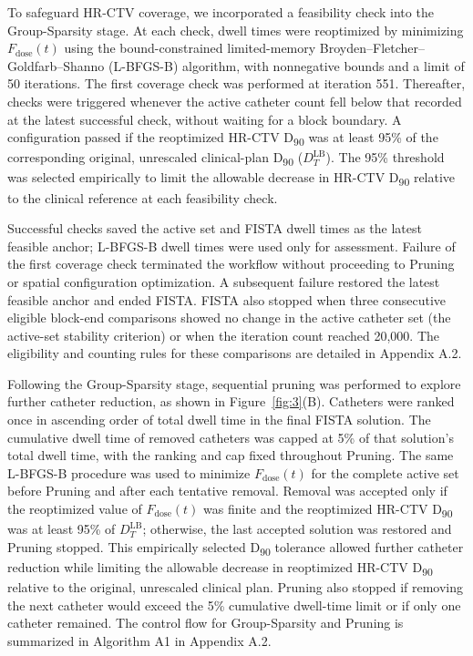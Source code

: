 \documentclass[12pt,twoside,letterpaper]{article}
\newcounter{algorithm}
\begin{document}
To safeguard HR-CTV coverage, we incorporated a feasibility check into the Group-Sparsity stage. At each check, dwell times were reoptimized by minimizing $F_{\text{dose}}\left( t \right)$ using the bound-constrained limited-memory Broyden--Fletcher--Goldfarb--Shanno (L-BFGS-B) algorithm,\cite{ref76,ref77} with nonnegative bounds and a limit of 50 iterations. The first coverage check was performed at iteration 551. Thereafter, checks were triggered whenever the active catheter count fell below that recorded at the latest successful check, without waiting for a block boundary. A configuration passed if the reoptimized HR-CTV D\textsubscript{90} was at least 95\% of the corresponding original, unrescaled clinical-plan D\textsubscript{90} ($D_{T}^{\text{LB}}$). The 95\% threshold was selected empirically to limit the allowable decrease in HR-CTV D\textsubscript{90} relative to the clinical reference at each feasibility check.

Successful checks saved the active set and FISTA dwell times as the latest feasible anchor; L-BFGS-B dwell times were used only for assessment. Failure of the first coverage check terminated the workflow without proceeding to Pruning or spatial configuration optimization. A subsequent failure restored the latest feasible anchor and ended FISTA. FISTA also stopped when three consecutive eligible block-end comparisons showed no change in the active catheter set (the active-set stability criterion) or when the iteration count reached 20,000. The eligibility and counting rules for these comparisons are detailed in Appendix A.2.

Following the Group-Sparsity stage, sequential pruning was performed to explore further catheter reduction, as shown in Figure~\ref{fig:3}(B). Catheters were ranked once in ascending order of total dwell time in the final FISTA solution. The cumulative dwell time of removed catheters was capped at 5\% of that solution's total dwell time, with the ranking and cap fixed throughout Pruning. The same L-BFGS-B procedure was used to minimize $F_{\text{dose}}\left( t \right)$ for the complete active set before Pruning and after each tentative removal. Removal was accepted only if the reoptimized value of $F_{\text{dose}}\left( t \right)$ was finite and the reoptimized HR-CTV D\textsubscript{90} was at least 95\% of $D_{T}^{\text{LB}}$; otherwise, the last accepted solution was restored and Pruning stopped. This empirically selected D\textsubscript{90} tolerance allowed further catheter reduction while limiting the allowable decrease in reoptimized HR-CTV D\textsubscript{90} relative to the original, unrescaled clinical plan. Pruning also stopped if removing the next catheter would exceed the 5\% cumulative dwell-time limit or if only one catheter remained. The control flow for Group-Sparsity and Pruning is summarized in Algorithm A1 in Appendix A.2.
\end{document}
